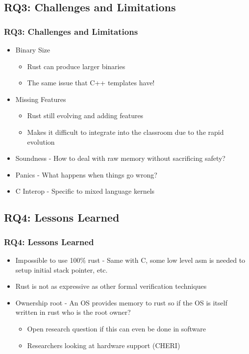 \documentclass{beamer}
\begin{document}
\subsection{RQ3: Challenges and Limitations}
\begin{frame}
  \frametitle{RQ3: Challenges and Limitations}
  \begin{itemize}
  \item<1-> Binary Size
    \begin{itemize}
    \item Rust can produce larger binaries
    \item The same issue that C++ templates have!
    \end{itemize}
  \item<2-> Missing Features
    \begin{itemize}
    \item Rust still evolving and adding features
    \item Makes it difficult to integrate into the classroom due to the rapid evolution
    \end{itemize}
  \item<3-> Soundness - How to deal with raw memory without sacrificing safety?
  \item<4-> Panics - What happens when things go wrong?
  \item<5-> C Interop - Specific to mixed language kernels
  \end{itemize}
\end{frame}

\subsection{RQ4: Lessons Learned}

\begin{frame}
  \frametitle{RQ4: Lessons Learned}
  \begin{itemize}
  \item<1-> Impossible to use 100$\%$ rust - Same with C, some low level asm is needed to setup initial stack
    pointer, etc.
  \item<2-> Rust is not as expressive as other formal verification techniques
  \item<3-> Ownership root - An OS provides memory to rust so if the OS is itself written in rust
    who is the root owner?
    \begin{itemize}
    \item Open research question if this can even be done in software
    \item Researchers looking at hardware support (CHERI)
    \end{itemize}
  \end{itemize}

\end{frame}
\end{document}
